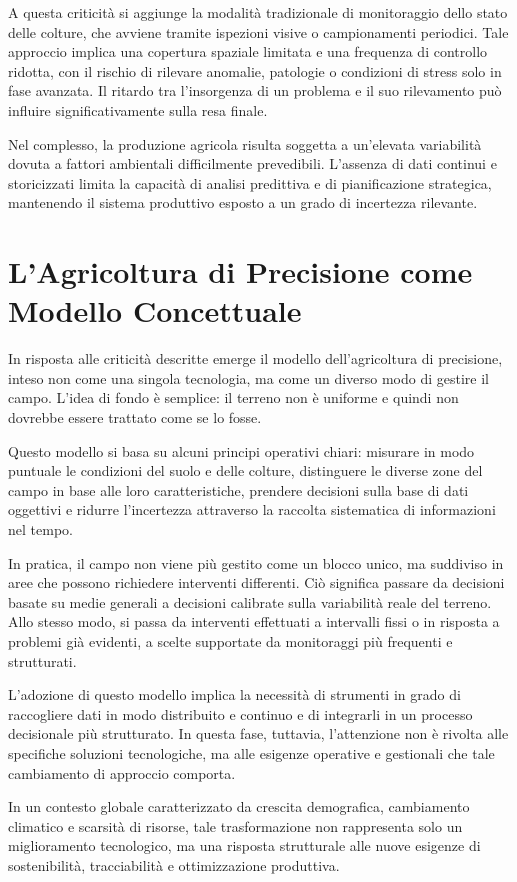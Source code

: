 A questa criticità si aggiunge la modalità tradizionale di monitoraggio dello stato delle colture, che avviene tramite ispezioni visive o campionamenti periodici. Tale approccio implica una copertura spaziale limitata e una frequenza di controllo ridotta, con il rischio di rilevare anomalie, patologie o condizioni di stress solo in fase avanzata. Il ritardo tra l’insorgenza di un problema e il suo rilevamento può influire significativamente sulla resa finale.\newline


Nel complesso, la produzione agricola risulta soggetta a un’elevata variabilità dovuta a fattori ambientali difficilmente prevedibili. L’assenza di dati continui e storicizzati limita la capacità di analisi predittiva e di pianificazione strategica, mantenendo il sistema produttivo esposto a un grado di incertezza rilevante.


\section{L’Agricoltura di Precisione come Modello Concettuale}
In risposta alle criticità descritte emerge il modello dell’agricoltura di precisione, inteso non come una singola tecnologia, ma come un diverso modo di gestire il campo. L’idea di fondo è semplice: il terreno non è uniforme e quindi non dovrebbe essere trattato come se lo fosse.

Questo modello si basa su alcuni principi operativi chiari: misurare in modo puntuale le condizioni del suolo e delle colture, distinguere le diverse zone del campo in base alle loro caratteristiche, prendere decisioni sulla base di dati oggettivi e ridurre l’incertezza attraverso la raccolta sistematica di informazioni nel tempo.

In pratica, il campo non viene più gestito come un blocco unico, ma suddiviso in aree che possono richiedere interventi differenti. Ciò significa passare da decisioni basate su medie generali a decisioni calibrate sulla variabilità reale del terreno. Allo stesso modo, si passa da interventi effettuati a intervalli fissi o in risposta a problemi già evidenti, a scelte supportate da monitoraggi più frequenti e strutturati.

L’adozione di questo modello implica la necessità di strumenti in grado di raccogliere dati in modo distribuito e continuo e di integrarli in un processo decisionale più strutturato. In questa fase, tuttavia, l’attenzione non è rivolta alle specifiche soluzioni tecnologiche, ma alle esigenze operative e gestionali che tale cambiamento di approccio comporta.


\noindent In un contesto globale caratterizzato da crescita demografica, cambiamento climatico e scarsità di risorse, tale trasformazione non rappresenta solo un miglioramento tecnologico, ma una risposta strutturale alle nuove esigenze di sostenibilità, tracciabilità e ottimizzazione produttiva.